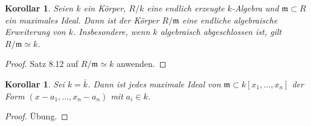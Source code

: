 \documentclass[reqno,12pt]{article}
\numberwithin{equation}{section}
\newcommand{\iso}{\simeq}
\theoremstyle{plain}
\newtheorem{cor}[thm]{Korollar}
\theoremstyle{definition}
\begin{document}
\begin{cor}\label{weak-nullstellensatz}
Seien $k$ ein Körper, $R/k$ eine endlich erzeugte $k$-Algebra und $\mathfrak{m} \subset R$ ein maximales Ideal. Dann ist der Körper $R/\mathfrak{m}$ eine endliche algebraische Erweiterung von $k$. Insbesondere, wenn $k$ algebraisch abgeschlossen ist, gilt $R/\mathfrak{m} \iso k$.
\end{cor}

\begin{proof}
Satz 8.12 auf $R/\mathfrak{m} \iso k$ anwenden.
\end{proof}

\begin{cor}
Sei $k = \bar{k}$. Dann ist jedes maximale Ideal von $\mathfrak{m} \subset k[x_1, \dots, x_n]$ der Form $(x-a_1, \dots, x_n-a_n)$ mit $a_i \in k$.
\end{cor}

\begin{proof}
Übung.
\end{proof}


\newpage


\end{document}
